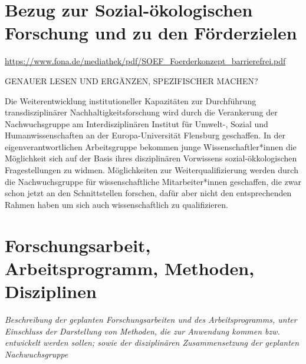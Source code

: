 \documentclass[a4paper,11pt,twoside]{scrartcl}
\begin{document}
 

\section{Bezug zur Sozial-ökologischen Forschung und zu den Förderzielen}

\url{https://www.fona.de/mediathek/pdf/SOEF_Foerderkonzept_barrierefrei.pdf}

GENAUER LESEN UND ERGÄNZEN, SPEZIFISCHER MACHEN?


Die Weiterentwicklung institutioneller Kapazitäten zur Durchführung transdisziplinärer Nachhaltigkeitsforschung wird durch die Verankerung der Nachwuchsgruppe am Interdisziplinären Institut für Umwelt-, Sozial und Humanwissenschaften an der Europa-Universität Flensburg geschaffen. In der eigenverantwortlichen Arbeitsgruppe bekommen junge Wissenschaftler*innen die Möglichkeit sich auf der Basis ihres disziplinären Vorwissens sozial-ökkologischen Fragestellungen zu  widmen. Möglichkeiten zur Weiterqualifizierung werden durch die  Nachwuchsgruppe für wissenschaftliche Mitarbeiter*innen geschaffen, die zwar schon jetzt an den Schnittstellen forschen, dafür aber nicht den entsprechenden Rahmen haben um sich auch wissenschaftlich zu qualifizieren.

\section{Forschungsarbeit, Arbeitsprogramm, Methoden, Disziplinen}
\textit{Beschreibung der geplanten Forschungsarbeiten und des Arbeitsprogramms, unter Einschluss der Darstellung von Methoden, die zur Anwendung kommen bzw. entwickelt werden sollen; sowie der disziplinären Zusammensetzung der geplanten Nachwuchsgruppe}
\end{document}
